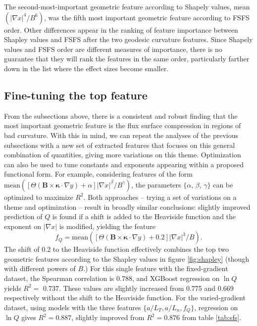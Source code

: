 \documentclass{jpp}
\newcommand{\changed}[1]{{#1}}
\begin{document}
\changed{
The second-most-important geometric feature according to Shapely values, mean$(|\nabla x|^4/B^6)$, was the fifth most important geometric feature according to FSFS order.
Other differences appear in the ranking of feature importance between Shapley values and FSFS after the two geodesic curvature features.
Since Shapely values and FSFS order are different measures of importance, there is no guarantee that they will rank the features in the same order, particularly farther down in the list where the effect sizes become smaller.
}


\subsection{Fine-tuning the top feature}
\label{sec:optimizing_top_feature}

From the subsections above, there is a consistent and robust finding that the most important geometric feature is the flux surface compression in regions of bad curvature.
With this in mind, we can repeat the analyses of the previous subsections with a new set of extracted features that focuses on this general combination of quantities, giving more variations on this theme.
Optimization can also be used to tune constants and exponents appearing within a proposed functional form.
For example, considering features of the form $\mathrm{mean}([\Theta(\mathbf{B}\times\mathbf{\kappa}\cdot\nabla y) + \alpha ] |\nabla x|^\beta / B^\gamma)$, the parameters $\{\alpha,\, \beta,\, \gamma\}$ can be optimized to maximize $R^2$.
Both approaches -- trying a set of variations on a theme and optimization -- result in broadly similar conclusions:
slightly improved prediction of $Q$ is found if a shift is added to the Heaviside function and the exponent on $|\nabla x|$ is modified, yielding the feature
\begin{equation}
    f_Q = \mathrm{mean}([\Theta(\mathbf{B}\times\mathbf{\kappa}\cdot\nabla y) + 0.2] |\nabla x|^3 / B).
    \label{eq:best_feature}
\end{equation}
The shift of 0.2 to the Heaviside function effectively combines the top two geometric features according to the Shapley values in figure \ref{fig:shapley} (though with different powers of $B$.)
For this single feature with the fixed-gradient dataset, the Spearman correlation is 0.788, and XGBoost regression on $\ln Q$ yields $R^2 =$ 0.737.
These values are slightly increased from 0.775 and 0.669 respectively without the shift to the Heaviside function.
For the varied-gradient dataset, using models with the three features $\{ a/L_T, a/L_n, f_Q\}$, regression on $\ln Q$ gives $R^2=0.887$, slightly improved from $R^2=0.876$ from table \ref{tab:sfs}.
\end{document}
